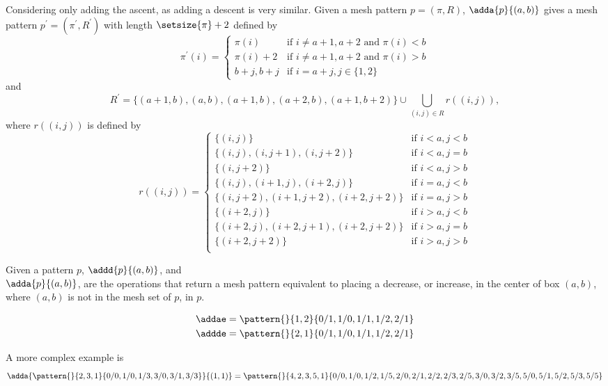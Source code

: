 \begin{definition}
Considering
only adding the ascent, as adding a descent is very similar.
Given a mesh pattern \(p = (\pi, R)\), \(\adda{p}{(a,b)}\) gives a mesh
pattern \(p^\prime = (\pi^\prime,R^\prime)\) with length \(\setsize{\pi}+2\) defined by
\begin{equation*}
    \pi^\prime(i) = \begin{cases}
    \pi(i) & \text{if } i\neq a+1,a+2 \text{ and } \pi(i)<b\\
    \pi(i)+2 & \text{if } i\neq a+1,a+2 \text{ and } \pi(i)>b\\
    b+j, b+j & \text{if } i = a+j, j\in\{1,2\}
\end{cases}
\end{equation*}
and
\begin{equation*}
        R^\prime = \{(a+1,b),(a,b),(a+1,b),(a+2,b),(a+1,b+2)\} \cup \bigcup_{(i,j)\in R}r((i,j)),
\end{equation*}
where \(r((i,j))\) is defined by
\begin{equation*}
    r((i,j)) =
    \begin{cases}
        \{(i,j)\} & \text{if } i<a, j<b\\
        \{(i,j),(i,j+1),(i,j+2)\} & \text{if } i<a, j=b\\
        \{(i,j+2)\} & \text{if } i<a, j>b\\
        \{(i,j),(i+1,j),(i+2,j)\} & \text{if } i=a, j<b\\
        \{(i,j+2),(i+1,j+2),(i+2,j+2)\} & \text{if } i=a, j>b\\
        \{(i+2,j)\} & \text{if } i>a, j<b\\
        \{(i+2,j),(i+2,j+1),(i+2,j+2)\} & \text{if } i>a, j=b\\
        \{(i+2,j+2)\} &\text{if } i>a, j>b\\
    \end{cases}
\end{equation*}
\end{definition}

Given a pattern \(p\), \(\addd{p}{(a,b)}\), and \\ \(\adda{p}{(a,b)}\),
are the operations that return a mesh pattern equivalent to placing a
decrease, or increase, in the center of box \((a,b)\), where \((a,b)\) is not
in the mesh set of \(p\), in \(p\).

\begin{example}
    \begin{align*}
        \addae = \pattern{}{1,2}{0/1,1/0,1/1,1/2,2/1}\\
        \addde = \pattern{}{2,1}{0/1,1/0,1/1,1/2,2/1}
    \end{align*}

    \noindent A more complex example is
\begin{equation*}
\adda{\pattern{}{2,3,1}{0/0,1/0,1/3,
                        3/0,3/1,3/3}}{(1,1)}
= \pattern{}{4,2,3,5,1}{0/0,
                        1/0,1/2,1/5,
                        2/0,2/1,2/2,2/3,2/5,
                        3/0,3/2,3/5,
                        5/0,5/1,5/2,5/3,5/5}
\end{equation*}
\end{example}

